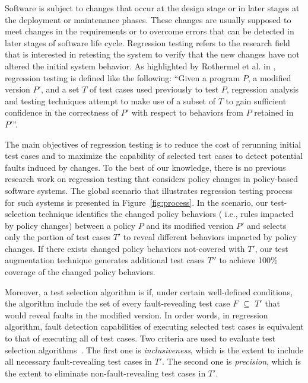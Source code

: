 Software is subject to changes that occur at the design stage or in later stages at the deployment or maintenance phases. These changes are 
usually supposed to meet changes in the requirements or to overcome errors that can be detected in later stages of software life cycle. 
Regression testing refers to the research field that is interested in retesting the system to verify that the new changes have not altered 
the initial system behavior. As highlighted by Rothermel et al. in \cite{Rothermel:1996:ART:235681.235682}, regression testing is defined like the 
following: 
``Given a program $P$, a modified version $P'$, and a set $T$ of test cases used previously to test $P$, regression analysis and testing 
techniques attempt to make use of a subset of $T$ to gain sufficient confidence in the correctness of $P'$ with respect to behaviors from $P$ retained 
in $P'$''.

The main objectives of regression testing is to reduce the cost of rerunning initial test cases and to maximize the capability of 
selected test cases to detect potential faults induced by changes.
To the best of our knowledge, there is no previous research work on regression testing that considers policy changes in policy-based software systems. 
The global scenario that illustrates regression testing process for such systems is presented in Figure~\ref{fig:process}.
In the scenario, our test-selection technique identifies the changed policy behaviors (
i.e., rules impacted by policy changes)
 between a policy $P$ and its modified version $P'$ and selects only the portion of test cases $T'$ to reveal different behaviors
impacted by policy changes. If there exists changed policy behaviors not-covered with $T'$, our test augmentation technique generates additional test cases $T''$  to achieve 100\% coverage of the changed policy behaviors.


Moreover, a test selection algorithm is  if, under certain well-defined conditions, the algorithm
include the set of every fault-revealing test case $F$ $\subseteq$ $T'$ that would reveal faults in the modified version.
In order words, in  regression algorithm, fault detection capabilities of executing selected test cases is equivalent to
that of executing all of test cases.
Two criteria are used to evaluate test selection algorithms~\cite{willmor05:safe}.
The first one is \emph{inclusiveness}, which is the extent to include
all necessary fault-revealing test cases in $T'$.
The second one is \emph{precision}, which is the extent to eliminate
non-fault-revealing test cases in $T'$.


